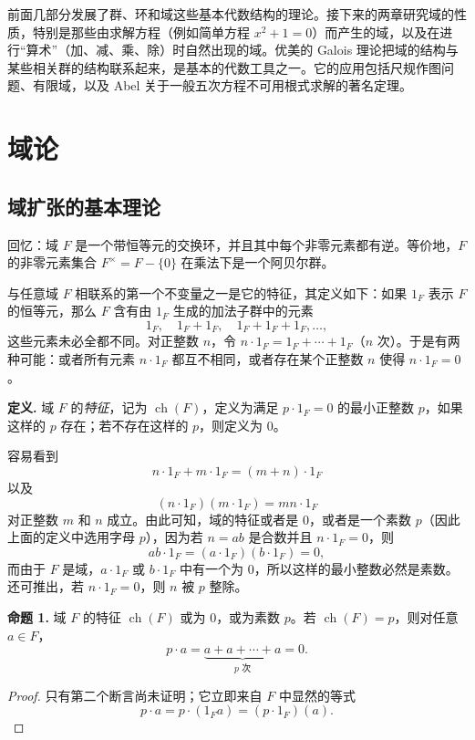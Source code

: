 
前面几部分发展了群、环和域这些基本代数结构的理论。接下来的两章研究域的性质，特别是那些由求解方程（例如简单方程 $x^2+1=0$）而产生的域，以及在进行“算术”（加、减、乘、除）时自然出现的域。优美的 Galois 理论把域的结构与某些相关群的结构联系起来，是基本的代数工具之一。它的应用包括尺规作图问题、有限域，以及 Abel 关于一般五次方程不可用根式求解的著名定理。

\chapter{域论}

\section{域扩张的基本理论}

回忆：域 $F$ 是一个带恒等元的交换环，并且其中每个非零元素都有逆。等价地，$F$ 的非零元素集合 $F^\times=F-\{0\}$ 在乘法下是一个阿贝尔群。

与任意域 $F$ 相联系的第一个不变量之一是它的特征，其定义如下：如果 $1_F$ 表示 $F$ 的恒等元，那么 $F$ 含有由 $1_F$ 生成的加法子群中的元素
\[
1_F,\quad 1_F+1_F,\quad 1_F+1_F+1_F,\ldots,
\]
这些元素未必全都不同。对正整数 $n$，令 $n\cdot 1_F=1_F+\cdots+1_F$（$n$ 次）。于是有两种可能：或者所有元素 $n\cdot 1_F$ 都互不相同，或者存在某个正整数 $n$ 使得 $n\cdot 1_F=0$。

\noindent\textbf{定义.} 域 $F$ 的\emph{特征}，记为 $\operatorname{ch}(F)$，定义为满足 $p\cdot 1_F=0$ 的最小正整数 $p$，如果这样的 $p$ 存在；若不存在这样的 $p$，则定义为 $0$。

容易看到
\[
n\cdot 1_F+m\cdot 1_F=(m+n)\cdot 1_F
\]
以及
\[
(n\cdot 1_F)(m\cdot 1_F)=mn\cdot 1_F \tag{13.1}
\]
对正整数 $m$ 和 $n$ 成立。由此可知，域的特征或者是 $0$，或者是一个素数 $p$（因此上面的定义中选用字母 $p$），因为若 $n=ab$ 是合数并且 $n\cdot 1_F=0$，则
\[
ab\cdot 1_F=(a\cdot 1_F)(b\cdot 1_F)=0,
\]
而由于 $F$ 是域，$a\cdot 1_F$ 或 $b\cdot 1_F$ 中有一个为 $0$，所以这样的最小整数必然是素数。还可推出，若 $n\cdot 1_F=0$，则 $n$ 被 $p$ 整除。

\noindent\textbf{命题 1.} 域 $F$ 的特征 $\operatorname{ch}(F)$ 或为 $0$，或为素数 $p$。若 $\operatorname{ch}(F)=p$，则对任意 $a\in F$，
\[
p\cdot a=\underbrace{a+a+\cdots+a}_{p\text{ 次}}=0.
\]

\begin{proof}
	只有第二个断言尚未证明；它立即来自 $F$ 中显然的等式
	\[
	p\cdot a=p\cdot(1_Fa)=(p\cdot 1_F)(a).
	\]
\end{proof}

